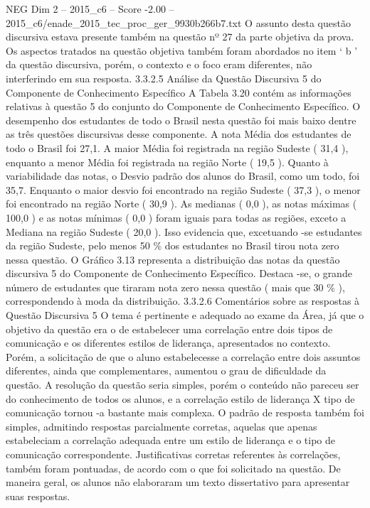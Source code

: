 \begin{textsample}{NEG Dim 2 – 2015\_c6 – Score -2.00 – 2015\_c6/enade\_2015\_tec\_proc\_ger\_9930b266b7.txt}
O assunto desta questão discursiva estava presente também na questão nº 27 da parte objetiva da prova.
Os aspectos tratados na questão objetiva também foram abordados no item ‘ b ’ da questão discursiva, porém, o contexto e o foco eram diferentes, não interferindo em sua resposta. 3.3.2.5 Análise da Questão Discursiva 5 do Componente de Conhecimento Específico A Tabela 3.20 contém as informações relativas à questão 5 do conjunto do Componente de Conhecimento Específico.
O desempenho dos estudantes de todo o Brasil nesta questão foi mais baixo dentre as três questões discursivas desse componente.
A nota Média dos estudantes de todo o Brasil foi 27,1.
A maior Média foi registrada na região Sudeste ( 31,4 ), enquanto a menor Média foi registrada na região Norte ( 19,5 ).
Quanto à variabilidade das notas, o Desvio padrão dos alunos do Brasil, como um todo, foi 35,7.
Enquanto o maior desvio foi encontrado na região Sudeste ( 37,3 ), o menor foi encontrado na região Norte ( 30,9 ).
As medianas ( 0,0 ), as notas máximas ( 100,0 ) e as notas mínimas ( 0,0 ) foram iguais para todas as regiões, exceto a Mediana na região Sudeste ( 20,0 ).
Isso evidencia que, excetuando -se estudantes da região Sudeste, pelo menos 50 \% dos estudantes no Brasil tirou nota zero nessa questão.
O Gráfico 3.13 representa a distribuição das notas da questão discursiva 5 do Componente de Conhecimento Específico.
Destaca -se, o grande número de estudantes que tiraram nota zero nessa questão ( mais que 30 \% ), correspondendo à moda da distribuição. 3.3.2.6 Comentários sobre as respostas à Questão Discursiva 5 O tema é pertinente e adequado ao exame da Área, já que o objetivo da questão era o de estabelecer uma correlação entre dois tipos de comunicação e os diferentes estilos de liderança, apresentados no contexto.
Porém, a solicitação de que o aluno estabelecesse a correlação entre dois assuntos diferentes, ainda que complementares, aumentou o grau de dificuldade da questão.
A resolução da questão seria simples, porém o conteúdo não pareceu ser do conhecimento de todos os alunos, e a correlação estilo de liderança X tipo de comunicação tornou -a bastante mais complexa.
O padrão de resposta também foi simples, admitindo respostas parcialmente corretas, aquelas que apenas estabeleciam a correlação adequada entre um estilo de liderança e o tipo de comunicação correspondente.
Justificativas corretas referentes às correlações, também foram pontuadas, de acordo com o que foi solicitado na questão.
De maneira geral, os alunos não elaboraram um texto dissertativo para apresentar suas respostas.

\end{textsample}
